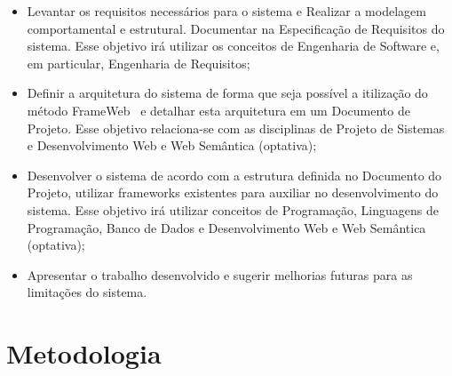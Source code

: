 \begin{itemize}
	
	\item Levantar os requisitos necessários para o sistema e Realizar a modelagem comportamental e estrutural. Documentar na Especificação de Requisitos do sistema. Esse objetivo irá utilizar os conceitos de Engenharia de Software e, em particular, Engenharia de Requisitos;	
	
  	
  	
  	\item Definir a arquitetura do sistema de forma que seja possível a itilização do método FrameWeb~\cite{vitorFrameWeb} e detalhar esta arquitetura em um Documento de Projeto. Esse objetivo relaciona-se com as disciplinas de Projeto de Sistemas e Desenvolvimento Web e Web Semântica (optativa);
  	
  	
  	\item Desenvolver o sistema de acordo com a estrutura definida no Documento do Projeto, utilizar frameworks existentes para auxiliar no desenvolvimento do sistema. Esse objetivo irá utilizar conceitos de Programação, Linguagens de Programação, Banco de Dados  e Desenvolvimento Web e Web Semântica (optativa);
  	 

	\item Apresentar o trabalho desenvolvido e sugerir melhorias futuras para as limitações do sistema.

\end{itemize}







\section{Metodologia}
\label{sec-intro-metodologia}

